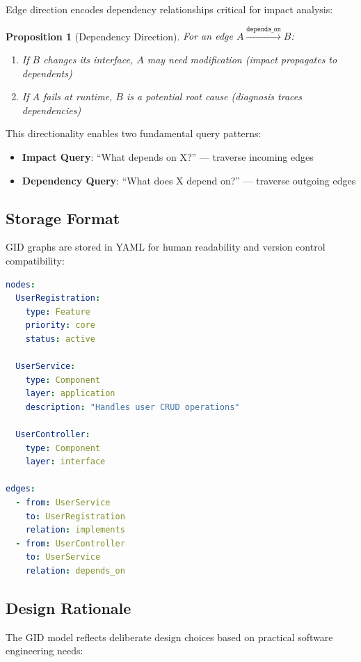 \documentclass[11pt,a4paper]{article}
\newtheorem{proposition}{Proposition}
\begin{document}
Edge direction encodes dependency relationships critical for impact analysis:

\begin{proposition}[Dependency Direction]
For an edge $A \xrightarrow{\texttt{depends\_on}} B$:
\begin{enumerate}[noitemsep]
    \item If $B$ changes its interface, $A$ may need modification (impact propagates to dependents)
    \item If $A$ fails at runtime, $B$ is a potential root cause (diagnosis traces dependencies)
\end{enumerate}
\end{proposition}

This directionality enables two fundamental query patterns:
\begin{itemize}[noitemsep]
    \item \textbf{Impact Query}: ``What depends on X?'' --- traverse incoming edges
    \item \textbf{Dependency Query}: ``What does X depend on?'' --- traverse outgoing edges
\end{itemize}

\subsection{Storage Format}

GID graphs are stored in YAML for human readability and version control compatibility:

\begin{lstlisting}[language=yaml,caption=Example GID Graph]
nodes:
  UserRegistration:
    type: Feature
    priority: core
    status: active

  UserService:
    type: Component
    layer: application
    description: "Handles user CRUD operations"

  UserController:
    type: Component
    layer: interface

edges:
  - from: UserService
    to: UserRegistration
    relation: implements
  - from: UserController
    to: UserService
    relation: depends_on
\end{lstlisting}

\subsection{Design Rationale}

The GID model reflects deliberate design choices based on practical software engineering needs:
\end{document}

